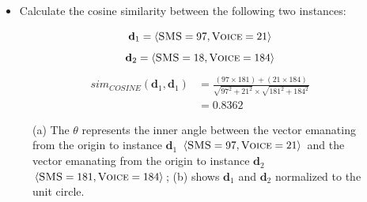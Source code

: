 \documentclass[xcolor={table}]{beamer}
\def\<{\langle}
\def\>{\rangle}
\newcommand{\featN}[1]{\textsc{#1}}
\begin{document}
 \begin{frame} 
 \begin{itemize}
	\item Calculate the cosine similarity between the following two instances:
\end{itemize}
\begin{equation*}
	 \mathbf{d}_{1} = \< \featN{SMS} = 97, \featN{Voice} = 21 \>
\end{equation*}
\begin{equation*}
	 \mathbf{d}_{2} = \< \featN{SMS} = 18,  \featN{Voice} = 184 \>
\end{equation*}
\begin{equation*}
	\begin{alignedat}{2}
sim_{COSINE}(\mathbf{d}_{1}, \mathbf{d}_{1}) &= \frac{\left(97 \times 181 \right)+ \left(21 \times 184\right)}{\sqrt{97^2 + 21^2} \times \sqrt{181^2 + 184^2}}\\
&= 0.8362
	\end{alignedat}
\end{equation*}
\end{frame} 



 \begin{frame} 
\begin{figure}[htb]
	\begin{centering}
	\caption{(a) The $\theta$ represents the inner angle between the vector emanating from the origin to instance $\mathbf{d}_{1}$ $\left<\featN{SMS}= 97, \featN{Voice}=21 \right>$ and the vector emanating from the origin to instance $\mathbf{d}_{2}$ $\left< \featN{SMS}=181, \featN{Voice}=184\right>$; (b) shows $\mathbf{d}_{1}$ and $\mathbf{d}_{2}$ normalized to the unit circle.}
	\label{fig:cosineImages}
		\end{centering}
\end{figure}
\end{frame} 
\end{document}
